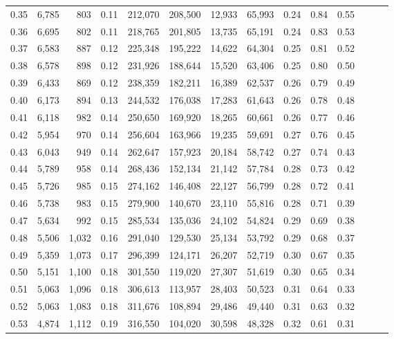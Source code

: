 \begin{tabular}{rrrrrrrrrrrrrr}
0.35 &  6,785 &    803 &  0.11 &  212,070 &  208,500 &  12,933 &  65,993 &  0.24 &  0.84 &      0.55 \\
0.36 &  6,695 &    802 &  0.11 &  218,765 &  201,805 &  13,735 &  65,191 &  0.24 &  0.83 &      0.53 \\
0.37 &  6,583 &    887 &  0.12 &  225,348 &  195,222 &  14,622 &  64,304 &  0.25 &  0.81 &      0.52 \\
0.38 &  6,578 &    898 &  0.12 &  231,926 &  188,644 &  15,520 &  63,406 &  0.25 &  0.80 &      0.50 \\
0.39 &  6,433 &    869 &  0.12 &  238,359 &  182,211 &  16,389 &  62,537 &  0.26 &  0.79 &      0.49 \\
0.40 &  6,173 &    894 &  0.13 &  244,532 &  176,038 &  17,283 &  61,643 &  0.26 &  0.78 &      0.48 \\
0.41 &  6,118 &    982 &  0.14 &  250,650 &  169,920 &  18,265 &  60,661 &  0.26 &  0.77 &      0.46 \\
0.42 &  5,954 &    970 &  0.14 &  256,604 &  163,966 &  19,235 &  59,691 &  0.27 &  0.76 &      0.45 \\
0.43 &  6,043 &    949 &  0.14 &  262,647 &  157,923 &  20,184 &  58,742 &  0.27 &  0.74 &      0.43 \\
0.44 &  5,789 &    958 &  0.14 &  268,436 &  152,134 &  21,142 &  57,784 &  0.28 &  0.73 &      0.42 \\
0.45 &  5,726 &    985 &  0.15 &  274,162 &  146,408 &  22,127 &  56,799 &  0.28 &  0.72 &      0.41 \\
0.46 &  5,738 &    983 &  0.15 &  279,900 &  140,670 &  23,110 &  55,816 &  0.28 &  0.71 &      0.39 \\
0.47 &  5,634 &    992 &  0.15 &  285,534 &  135,036 &  24,102 &  54,824 &  0.29 &  0.69 &      0.38 \\
0.48 &  5,506 &  1,032 &  0.16 &  291,040 &  129,530 &  25,134 &  53,792 &  0.29 &  0.68 &      0.37 \\
0.49 &  5,359 &  1,073 &  0.17 &  296,399 &  124,171 &  26,207 &  52,719 &  0.30 &  0.67 &      0.35 \\
0.50 &  5,151 &  1,100 &  0.18 &  301,550 &  119,020 &  27,307 &  51,619 &  0.30 &  0.65 &      0.34 \\
0.51 &  5,063 &  1,096 &  0.18 &  306,613 &  113,957 &  28,403 &  50,523 &  0.31 &  0.64 &      0.33 \\
0.52 &  5,063 &  1,083 &  0.18 &  311,676 &  108,894 &  29,486 &  49,440 &  0.31 &  0.63 &      0.32 \\
0.53 &  4,874 &  1,112 &  0.19 &  316,550 &  104,020 &  30,598 &  48,328 &  0.32 &  0.61 &      0.31 \\

\end{tabular}
